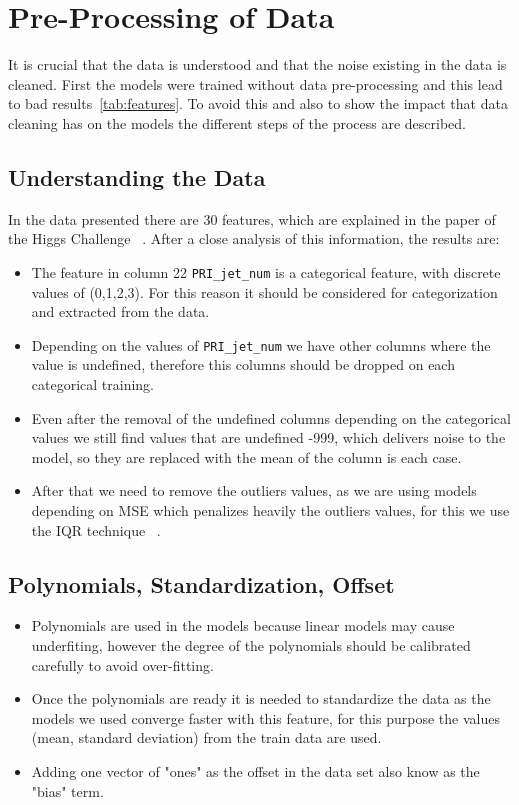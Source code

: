 \documentclass[10pt,conference,compsocconf]{IEEEtran}
\begin{document}
\section{Pre-Processing of Data}

\label{sec:Pre-Processing of Data}

It is crucial that the data is understood and that the noise existing in the 
data is cleaned. First the models were trained without data pre-processing
and this lead to bad results~\ref{tab:features}. To avoid this and also to 
show the impact that data cleaning has on the models the different
steps of the process are described.

\subsection{Understanding the Data}
In the data presented there are 30 features, which are explained in 
the paper of the Higgs Challenge ~\cite{higgs_challenge01}. After a 
close analysis of this information, the results are:

\begin{itemize}
 \label{text:categorical}
\item The feature in column 22 \texttt{PRI\_jet\_num} is a categorical feature,
with discrete values of (0,1,2,3). For this reason it should be considered
for categorization and extracted from the data.
\item Depending on the values of \texttt{PRI\_jet\_num}  we have other columns
where the value is undefined, therefore this columns should be dropped 
on each categorical training.
\item Even after the removal of the undefined columns depending on the
categorical values we still find values that are undefined -999, which delivers
noise to the model, so they are replaced with the mean of the column is each
case.
\item After that we need to remove the outliers values, as we are using models
depending on MSE which penalizes heavily the outliers values, for this we use
the IQR technique ~\cite{IQR01}.

\end{itemize}

\subsection{Polynomials, Standardization, Offset}
 \label{text:datasteps}
\begin{itemize}
\item Polynomials are used in the models because linear models may cause
underfiting, however the degree of the polynomials should be calibrated carefully
to avoid over-fitting.
\item Once the polynomials are ready it is needed to standardize the data 
as the models we used converge faster with this feature, for this purpose 
the values (mean, standard deviation) from the train data  are used.
\item Adding one vector of "ones" as the offset in the data set also know as the
"bias" term.

\end{itemize}
\end{document}
